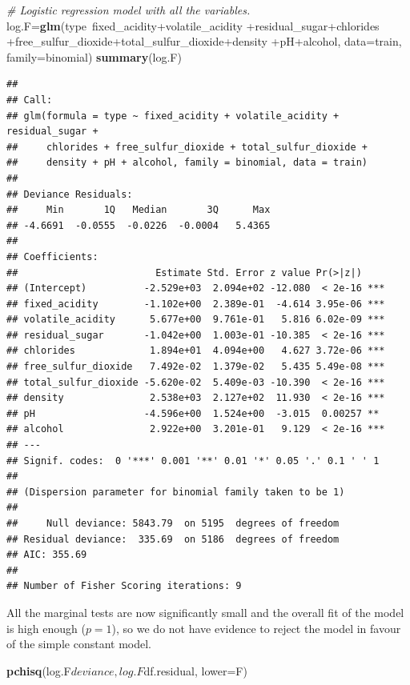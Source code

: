 \documentclass[12pt,]{article}
\newenvironment{Shaded}{\begin{snugshade}}{\end{snugshade}}
\newcommand{\KeywordTok}[1]{\textcolor[rgb]{0.13,0.29,0.53}{\textbf{{#1}}}}
\newcommand{\DataTypeTok}[1]{\textcolor[rgb]{0.13,0.29,0.53}{{#1}}}
\newcommand{\CommentTok}[1]{\textcolor[rgb]{0.56,0.35,0.01}{\textit{{#1}}}}
\newcommand{\NormalTok}[1]{{#1}}
\begin{document}
\begin{Shaded}
\begin{Highlighting}[]
\CommentTok{# Logistic regression model with all the variables.}
\NormalTok{log.F=}\KeywordTok{glm}\NormalTok{(type~fixed_acidity+volatile_acidity}
             \NormalTok{+residual_sugar+chlorides}
             \NormalTok{+free_sulfur_dioxide+total_sulfur_dioxide+density}
             \NormalTok{+pH+alcohol, }\DataTypeTok{data=}\NormalTok{train, }\DataTypeTok{family=}\NormalTok{binomial)}
\KeywordTok{summary}\NormalTok{(log.F)}
\end{Highlighting}
\end{Shaded}

\begin{verbatim}
## 
## Call:
## glm(formula = type ~ fixed_acidity + volatile_acidity + residual_sugar + 
##     chlorides + free_sulfur_dioxide + total_sulfur_dioxide + 
##     density + pH + alcohol, family = binomial, data = train)
## 
## Deviance Residuals: 
##     Min       1Q   Median       3Q      Max  
## -4.6691  -0.0555  -0.0226  -0.0004   5.4365  
## 
## Coefficients:
##                        Estimate Std. Error z value Pr(>|z|)    
## (Intercept)          -2.529e+03  2.094e+02 -12.080  < 2e-16 ***
## fixed_acidity        -1.102e+00  2.389e-01  -4.614 3.95e-06 ***
## volatile_acidity      5.677e+00  9.761e-01   5.816 6.02e-09 ***
## residual_sugar       -1.042e+00  1.003e-01 -10.385  < 2e-16 ***
## chlorides             1.894e+01  4.094e+00   4.627 3.72e-06 ***
## free_sulfur_dioxide   7.492e-02  1.379e-02   5.435 5.49e-08 ***
## total_sulfur_dioxide -5.620e-02  5.409e-03 -10.390  < 2e-16 ***
## density               2.538e+03  2.127e+02  11.930  < 2e-16 ***
## pH                   -4.596e+00  1.524e+00  -3.015  0.00257 ** 
## alcohol               2.922e+00  3.201e-01   9.129  < 2e-16 ***
## ---
## Signif. codes:  0 '***' 0.001 '**' 0.01 '*' 0.05 '.' 0.1 ' ' 1
## 
## (Dispersion parameter for binomial family taken to be 1)
## 
##     Null deviance: 5843.79  on 5195  degrees of freedom
## Residual deviance:  335.69  on 5186  degrees of freedom
## AIC: 355.69
## 
## Number of Fisher Scoring iterations: 9
\end{verbatim}

All the marginal tests are now significantly small and the overall fit
of the model is high enough (\(p = 1\)), so we do not have evidence to
reject the model in favour of the simple constant model.

\begin{Shaded}
\begin{Highlighting}[]
\KeywordTok{pchisq}\NormalTok{(log.F$deviance, log.F$df.residual, }\DataTypeTok{lower=}\NormalTok{F)}
\end{Highlighting}
\end{Shaded}
\end{document}
